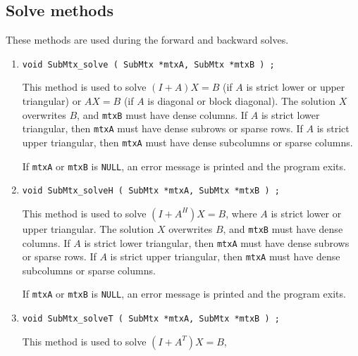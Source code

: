 \subsection{Solve methods}
\label{subsection:SubMtx:proto:solve}
\par
These methods are used during the forward and backward solves.
\par
\begin{enumerate}
\item
\begin{verbatim}
void SubMtx_solve ( SubMtx *mtxA, SubMtx *mtxB ) ;
\end{verbatim}
This method is used to solve $(I + A)X = B$ (if $A$ is strict lower
or upper triangular)
or $AX = B$ (if $A$ is diagonal or block diagonal).
The solution $X$ overwrites $B$, and {\tt mtxB} must have dense
columns.
If $A$ is strict lower triangular, then {\tt mtxA} must have dense
subrows or sparse rows.
If $A$ is strict upper triangular, then {\tt mtxA} must have dense
subcolumns or sparse columns.
\par {}
If {\tt mtxA} or {\tt mtxB} is {\tt NULL},
an error message is printed and the program exits.
\item
\begin{verbatim}
void SubMtx_solveH ( SubMtx *mtxA, SubMtx *mtxB ) ;
\end{verbatim}
This method is used to solve $(I + A^H)X = B$, 
where $A$ is strict lower or upper triangular.
The solution $X$ overwrites $B$, and {\tt mtxB} must have dense
columns.
If $A$ is strict lower triangular, then {\tt mtxA} must have dense
subrows or sparse rows.
If $A$ is strict upper triangular, then {\tt mtxA} must have dense
subcolumns or sparse columns.
\par {}
If {\tt mtxA} or {\tt mtxB} is {\tt NULL},
an error message is printed and the program exits.
\item
\begin{verbatim}
void SubMtx_solveT ( SubMtx *mtxA, SubMtx *mtxB ) ;
\end{verbatim}
This method is used to solve $(I + A^T)X = B$, 

\end{enumerate}
